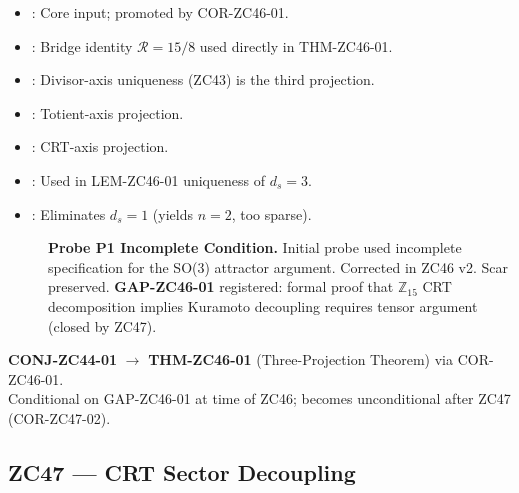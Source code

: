 \documentclass[12pt, a4paper]{article}
\begin{document}
\begin{inheritbox}[title={ZC46 Backward Inheritance}]
\begin{itemize}[leftmargin=1.5em]
\item {}: Core input;
  promoted by COR-ZC46-01.
\item {}: Bridge identity
  $\mathcal{R} = 15/8$ used directly in THM-ZC46-01.
\item {}: Divisor-axis
  uniqueness (ZC43) is the third projection.
\item {}: Totient-axis projection.
\item {}: CRT-axis projection.
\item {}: Used in
  LEM-ZC46-01 uniqueness of $d_s = 3$.
\item {}: Eliminates
  $d_s = 1$ (yields $n=2$, too sparse).
\end{itemize}
\end{inheritbox}

\begin{correctionbox}[title={ZC46 Forward Corrections / Phase Misalignments}]
\begin{description}
\item[] \textbf{Probe P1 Incomplete Condition.}
  Initial probe used incomplete specification for the SO(3) attractor
  argument. Corrected in ZC46 v2. Scar preserved.
  \textbf{GAP-ZC46-01} registered: formal proof that $\mathbb{Z}_{15}$
  CRT decomposition implies Kuramoto decoupling requires tensor argument
  (closed by ZC47).
\end{description}
\end{correctionbox}

\begin{conmapbox}[title={ZC46 Promotion Record}]
\textbf{CONJ-ZC44-01} $\to$ \textbf{THM-ZC46-01} (Three-Projection
Theorem) via COR-ZC46-01.\\
Conditional on GAP-ZC46-01 at time of ZC46; becomes unconditional
after ZC47 (COR-ZC47-02).
\end{conmapbox}

\subsection{ZC47 --- CRT Sector Decoupling}
\end{document}
